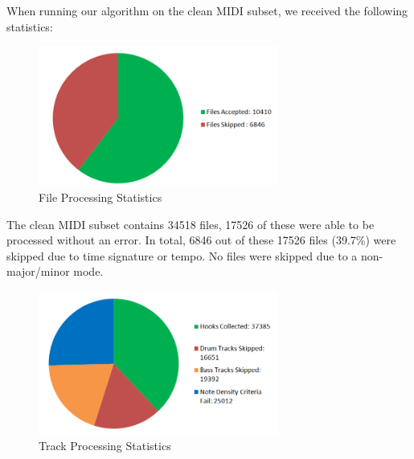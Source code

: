 \documentclass[a4paper,12pt]{extarticle}
\begin{document}
When running our algorithm on the clean MIDI subset, we received the following statistics:

\begin{figure}[H]
    \centering
    \includegraphics[width=0.7\textwidth]{fileproc.png}
    \caption{File Processing Statistics}
    \label{fig:tproc}
\end{figure}

The clean MIDI subset contains 34518 files, 17526 of these were able to be processed without an error. In total, 6846 out of these 17526 files (39.7\%) were skipped due to time signature or tempo. No files were skipped due to a non-major/minor mode.

\begin{figure}[H]
    \centering
    \includegraphics[width=0.7\textwidth]{trackproc.png}
    \caption{Track Processing Statistics}
    \label{fig:fproc}
\end{figure}
\end{document}

